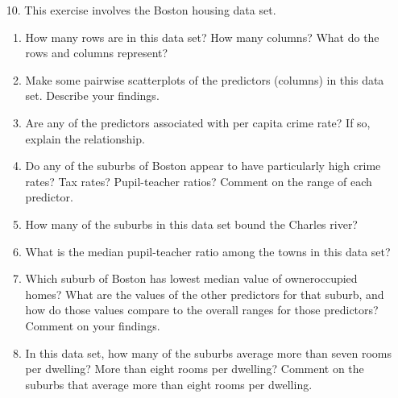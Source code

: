 \documentclass[12pt]{article}
\begin{document}
\begin{enumerate}
\item[10.] This exercise involves the Boston housing data set.
  \begin{enumerate}
    \item How many rows are in this data set? How many columns? What do the rows
          and columns represent?
    \item Make some pairwise scatterplots of the predictors (columns) in this
          data set. Describe your findings.
    \item Are any of the predictors associated with per capita crime rate? If
          so, explain the relationship.
    \item Do any of the suburbs of Boston appear to have particularly high crime
          rates? Tax rates? Pupil-teacher ratios? Comment on the range of each
          predictor.
    \item How many of the suburbs in this data set bound the Charles river?
    \item What is the median pupil-teacher ratio among the towns in this data set?
    \item Which suburb of Boston has lowest median value of owneroccupied homes?
          What are the values of the other predictors for that suburb, and how
          do those values compare to the overall ranges for those predictors?
          Comment on your findings.
    \item In this data set, how many of the suburbs average more than seven rooms
          per dwelling? More than eight rooms per dwelling? Comment on the suburbs
          that average more than eight rooms per dwelling.
  \end{enumerate}

\end{enumerate}
\end{document}
